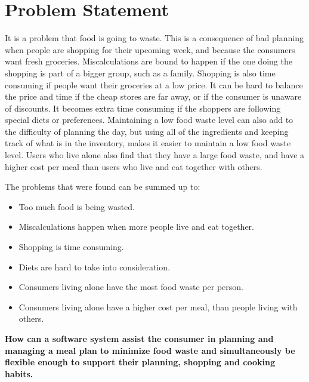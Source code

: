 \chapter{Problem Statement}
It is a problem that food is going to waste.
This is a consequence of bad planning when people are shopping for their upcoming week, and because the consumers want fresh groceries.
Miscalculations are bound to happen if the one doing the shopping is part of a bigger group, such as a family.
Shopping is also time consuming if people want their groceries at a low price.
It can be hard to balance the price and time if the cheap stores are far away, or if the consumer is unaware of discounts.
It becomes extra time consuming if the shoppers are following special diets or preferences.
Maintaining a low food waste level can also add to the difficulty of planning the day, but using all of the ingredients and keeping track of what is in the inventory, makes it easier to maintain a low food waste level.
Users who live alone also find that they have a large food waste, and have a higher cost per meal than users who live and eat together with others.

The problems that were found can be summed up to:

\begin{itemize}
    \item Too much food is being wasted.
    \item Miscalculations happen when more people live and eat together.
    \item Shopping is time consuming.
    \item Diets are hard to take into consideration.
    \item Consumers living alone have the most food waste per person.
    \item Consumers living alone have a higher cost per meal, than people living with others.
\end{itemize}

\textbf{How can a software system assist the consumer in planning and managing a meal plan to minimize food waste and simultaneously be flexible enough to support their planning, shopping and cooking habits.}